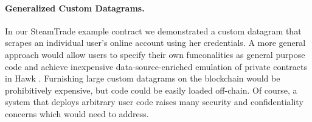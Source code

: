 \paragraph{Generalized Custom Datagrams.}
In our {\sf SteamTrade} example contract we demonstrated a custom datagram that scrapes an individual user's online account using her credentials.
A more general approach would allow users to specify their own funconalities as general purpose code and achieve inexpensive data-source-enriched emulation of private contracts in Hawk \cite{hawk}.
Furnishing large custom datagrams on the blockchain would be prohibitively expensive, but code could be easily loaded off-chain.
Of course, a system that deploys arbitrary user code raises many security and confidentiality concerns which \tc would need to address.
